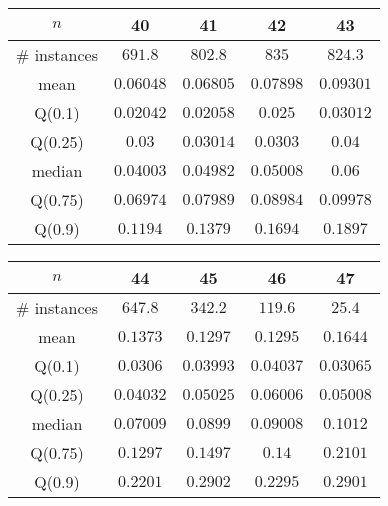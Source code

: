 \begin{tabular}{c|cccc} 
\hline 
$n$ & 40 & 41 & 42 & 43 \tabularnewline 
\hline 
\hline 
\# instances & $691.8$ & $802.8$ & $835$ & $824.3$ \tabularnewline 
mean & $0.06048$ & $0.06805$ & $0.07898$ & $0.09301$ \tabularnewline 
Q(0.1) & $0.02042$ & $0.02058$ & $0.025$ & $0.03012$ \tabularnewline 
Q(0.25) & $0.03$ & $0.03014$ & $0.0303$ & $0.04$ \tabularnewline 
median & $0.04003$ & $0.04982$ & $0.05008$ & $0.06$ \tabularnewline 
Q(0.75) & $0.06974$ & $0.07989$ & $0.08984$ & $0.09978$ \tabularnewline 
Q(0.9) & $0.1194$ & $0.1379$ & $0.1694$ & $0.1897$ \tabularnewline 
\hline 
\end{tabular} 
\medskip{} 

\begin{tabular}{c|cccc} 
\hline 
$n$ & 44 & 45 & 46 & 47 \tabularnewline 
\hline 
\hline 
\# instances & $647.8$ & $342.2$ & $119.6$ & $25.4$ \tabularnewline 
mean & $0.1373$ & $0.1297$ & $0.1295$ & $0.1644$ \tabularnewline 
Q(0.1) & $0.0306$ & $0.03993$ & $0.04037$ & $0.03065$ \tabularnewline 
Q(0.25) & $0.04032$ & $0.05025$ & $0.06006$ & $0.05008$ \tabularnewline 
median & $0.07009$ & $0.0899$ & $0.09008$ & $0.1012$ \tabularnewline 
Q(0.75) & $0.1297$ & $0.1497$ & $0.14$ & $0.2101$ \tabularnewline 
Q(0.9) & $0.2201$ & $0.2902$ & $0.2295$ & $0.2901$ \tabularnewline 
\hline 
\end{tabular} 
\medskip{} 

